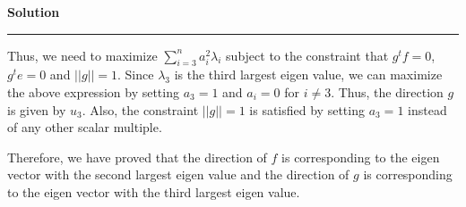 \documentclass[a4paper,12pt]{article}
\newenvironment{solution}[2][]{%
    \begin{mdframed}[linecolor=blue!70!black, linewidth=2pt, roundcorner=10pt, backgroundcolor=yellow!10!white, skipabove=12pt, skipbelow=12pt]%
        \textbf{\large #2}
        \par\noindent\rule{\textwidth}{0.4pt}
}{
    \end{mdframed}
}
\begin{document}
\begin{solution}{Solution}
Thus, we need to maximize $\sum_{i=3}^n a_i^2\lambda_i$ subject to the constraint that $g^{t}f = 0$, $g^{t}e = 0$ and $||g|| = 1$. Since $\lambda_3$ is the third largest eigen value, we can maximize the above expression by setting $a_3 = 1$ and $a_i = 0$ for $i \neq 3$. Thus, the direction $g$ is given by $u_3$. Also, the constraint $||g|| = 1$ is satisfied by setting $a_3 = 1$ instead of any other scalar multiple.


Therefore, we have proved that the direction of $f$ is corresponding to the eigen vector with the second largest eigen value and the direction of $g$ is corresponding to the eigen vector with the third largest eigen value.
\end{solution}


\end{document}
